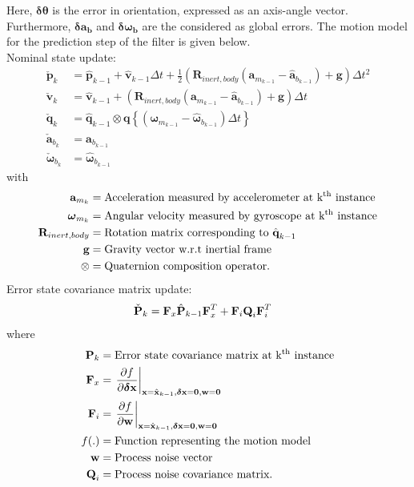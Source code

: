 Here, $\boldsymbol{\delta}\boldsymbol{\theta}$ is the error in orientation, expressed as an axis-angle vector. Furthermore, $\boldsymbol{\delta}\boldsymbol{a_b}$ and $\boldsymbol{\delta}\boldsymbol{\omega_b}$ are the considered as global errors. The motion model for the prediction step of the filter is given below.\\
Nominal state update:
\begin{align}
    \check{\textbf{p}}_k &= \hat{\textbf{p}}_{k-1}+\hat{\textbf{v}}_{k-1}\Delta t + \frac{1}{2} \left( \textbf{R}_{inert,body}\left(\textbf{a}_{m_{k-1}}-\hat{\textbf{a}}_{b_{k-1}}\right)+\textbf{g}\right)\Delta t^2 \\
    \check{\textbf{v}}_k &= \hat{\textbf{v}}_{k-1}+\left(\textbf{R}_{inert,body}\left(\textbf{a}_{m_{k-1}}-\hat{\textbf{a}}_{b_{k-1}}\right)+\textbf{g}\right)\Delta t \\
    \check{\textbf{q}}_k &= \hat{\textbf{q}}_{k-1}\otimes \textbf{q}\left\{\left(\boldsymbol{\omega}_{m_{k-1}}-\hat{\boldsymbol{\omega}}_{b_{k-1}}\right)\Delta t\right\} \\
    \check{\textbf{a}}_{b_k} &= \hat{\textbf{a}}_{b_{k-1}} \\
    \check{\boldsymbol{\omega}}_{b_{k}} &= \hat{\boldsymbol{\omega}}_{b_{k-1}}
\end{align}
with
\begin{align}
	\textbf{a}_{m_{k}} &= \text{Acceleration measured by accelerometer at k\textsuperscript{th} instance}\\
	\boldsymbol{\omega}_{m_{k}} &= \text{Angular velocity measured by gyroscope at k\textsuperscript{th} instance}\\
    \textbf{R}_{inert,body} &= \text{Rotation matrix corresponding to $\hat{\textbf{q}}_{k-1}$} \\
	\textbf{g} &= \text{Gravity vector w.r.t inertial frame}\\
	\otimes &= \text{Quaternion composition operator.}
\end{align}
Error state covariance matrix update:
\begin{align}
    \Check{\textbf{P}}_k &= \textbf{F}_x\hat{\textbf{P}}_{k-1}\textbf{F}_x^T + \textbf{F}_i\textbf{Q}_i\textbf{F}_i^T
\end{align}
where
\begin{align}
	\textbf{P}_k &= \text{Error state covariance matrix at k\textsuperscript{th} instance}\\
	\textbf{F}_x &= \left.\frac{\partial f}{\partial \boldsymbol{\delta}\textbf{x}}\right|_{\textbf{x}=\hat{\textbf{x}}_{k-1} , \boldsymbol{\delta}\textbf{x}=\textbf{0} , \textbf{w}=\textbf{0}}\\
	\textbf{F}_i &= \left.\frac{\partial f}{\partial \textbf{w}}\right|_{\textbf{x}=\hat{\textbf{x}}_{k-1} , \boldsymbol{\delta}\textbf{x}=\textbf{0} , \textbf{w}=\textbf{0}}\\
	f(.) &= \text{Function representing the motion model}\\
	\textbf{w} &= \text{Process noise vector}\\
	\textbf{Q}_i &= \text{Process noise covariance matrix}.
\end{align}
